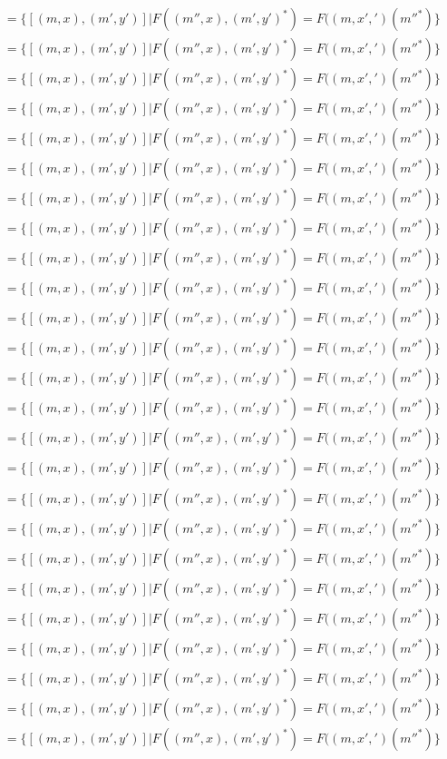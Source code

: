 \documentclass[a4paper,reqno,oneside]{article}
\begin{document}
\begin{align*}
&= \{[(m,x),(m',y')] | F((m'',x),(m',y')^*) = F((m,x',')(m''^*)\}\\
&= \{[(m,x),(m',y')] | F((m'',x),(m',y')^*) = F((m,x',')(m''^*)\}\\
&= \{[(m,x),(m',y')] | F((m'',x),(m',y')^*) = F((m,x',')(m''^*)\}\\
&= \{[(m,x),(m',y')] | F((m'',x),(m',y')^*) = F((m,x',')(m''^*)\}\\
&= \{[(m,x),(m',y')] | F((m'',x),(m',y')^*) = F((m,x',')(m''^*)\}\\
&= \{[(m,x),(m',y')] | F((m'',x),(m',y')^*) = F((m,x',')(m''^*)\}\\
&= \{[(m,x),(m',y')] | F((m'',x),(m',y')^*) = F((m,x',')(m''^*)\}\\
&= \{[(m,x),(m',y')] | F((m'',x),(m',y')^*) = F((m,x',')(m''^*)\}\\
&= \{[(m,x),(m',y')] | F((m'',x),(m',y')^*) = F((m,x',')(m''^*)\}\\
&= \{[(m,x),(m',y')] | F((m'',x),(m',y')^*) = F((m,x',')(m''^*)\}\\
&= \{[(m,x),(m',y')] | F((m'',x),(m',y')^*) = F((m,x',')(m''^*)\}\\
&= \{[(m,x),(m',y')] | F((m'',x),(m',y')^*) = F((m,x',')(m''^*)\}\\
&= \{[(m,x),(m',y')] | F((m'',x),(m',y')^*) = F((m,x',')(m''^*)\}\\
&= \{[(m,x),(m',y')] | F((m'',x),(m',y')^*) = F((m,x',')(m''^*)\}\\
&= \{[(m,x),(m',y')] | F((m'',x),(m',y')^*) = F((m,x',')(m''^*)\}\\
&= \{[(m,x),(m',y')] | F((m'',x),(m',y')^*) = F((m,x',')(m''^*)\}\\
&= \{[(m,x),(m',y')] | F((m'',x),(m',y')^*) = F((m,x',')(m''^*)\}\\
&= \{[(m,x),(m',y')] | F((m'',x),(m',y')^*) = F((m,x',')(m''^*)\}\\
&= \{[(m,x),(m',y')] | F((m'',x),(m',y')^*) = F((m,x',')(m''^*)\}\\
&= \{[(m,x),(m',y')] | F((m'',x),(m',y')^*) = F((m,x',')(m''^*)\}\\
&= \{[(m,x),(m',y')] | F((m'',x),(m',y')^*) = F((m,x',')(m''^*)\}\\
&= \{[(m,x),(m',y')] | F((m'',x),(m',y')^*) = F((m,x',')(m''^*)\}\\
&= \{[(m,x),(m',y')] | F((m'',x),(m',y')^*) = F((m,x',')(m''^*)\}\\
&= \{[(m,x),(m',y')] | F((m'',x),(m',y')^*) = F((m,x',')(m''^*)\}\\
&= \{[(m,x),(m',y')] | F((m'',x),(m',y')^*) = F((m,x',')(m''^*)\}\\

\end{align*}
\end{document}
